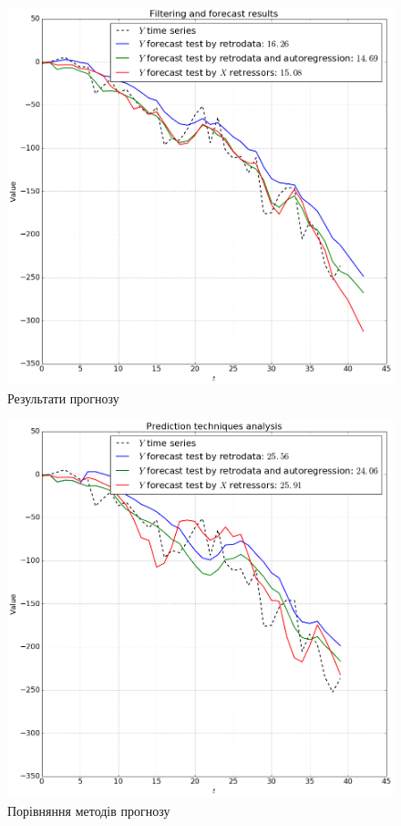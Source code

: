 \begin{figure}[h!]
  \centering
  \includegraphics[width=\textwidth]{Coursework3_files/Coursework3_9_0.png}
  \caption{Результати прогнозу}
  \label{fig:y:forecast:final}
\end{figure}

\begin{figure}[h!]
  \centering
  \includegraphics[width=\textwidth]{Coursework3_files/Coursework3_8_0.png}
  \caption{Порівняння методів прогнозу}
  \label{fig:y:forecast:comparison}
\end{figure}
